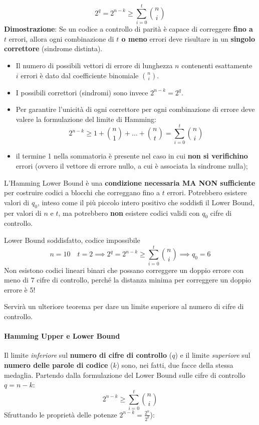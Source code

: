 \[2^q= 2^{n-k}\geq \sum_{i=0}^t\binom{n}{i}\]
\textbf{Dimostrazione}:
Se un codice a controllo di parità è capace di correggere \textbf{fino a $t$} errori, allora ogni combinazione di \textbf{$t$ o meno} errori deve risultare in un \textbf{singolo correttore} (sindrome distinta).
\begin{itemize}
    \item Il numero di possibili vettori di errore di lunghezza $n$ contenenti esattamente $i$ errori è dato dal coefficiente binomiale $\binom{n}{i}$.
    \item I possibili correttori (sindromi) sono invece $2^{n-k}=2^{q}$.
    \item Per garantire l'unicità di ogni correttore per ogni combinazione di errore deve valere la formulazione del limite di Hamming:
    \[2^{n-k}\geq 1 + \binom{n}{1}+\dots+ \binom{n}{t}=
    \sum_{i=0}^t\binom{n}{i}\]
    \item il termine 1 nella sommatoria è presente nel caso in cui \textbf{non si verifichino} errori (ovvero il vettore di errore nullo, a cui è associata la sindrome nulla);
\end{itemize}
L'Hamming Lower Bound è una \textbf{condizione necessaria MA NON sufficiente} per costruire codici a blocchi che correggano fino a $t$ errori. Potrebbero esistere valori di $q_0$, inteso come il più piccolo intero positivo che soddisfi il Lower Bound, per valori di $n$ e $t$, ma potrebbero \textbf{non} esistere codici validi con $q_0$ cifre di controllo.
\begin{esempio}{Lower Bound soddisfatto, codice impossibile}
\[n=10 \quad t=2 \implies 2^q= 2^{n-k}\geq \sum_{i=0}^t\binom{n}{i}\implies q_0=6\]
Non esistono codici lineari binari che possano correggere un doppio errore con meno di $7$ cifre di controllo, perché la distanza minima per correggere un doppio errore è 5!    
\end{esempio}
Servirà un ulteriore teorema per dare un limite superiore al numero di cifre di controllo.

\paragraph{Hamming Upper e Lower Bound}
Il limite \textit{inferiore} sul \textbf{numero di cifre di controllo} ($q$) e il limite \textit{superiore} sul \textbf{numero delle parole di codice} ($k$) sono, nei fatti, due facce della stessa medaglia.
Partendo dalla formulazione del Lower Bound sulle cifre di controllo $q = n-k$:
\[ 2^{n-k} \geq \sum_{i=0}^t\binom{n}{i} \]
Sfruttando le proprietà delle potenze $2^{n-k} = \frac{2^n}{2^k}$):

